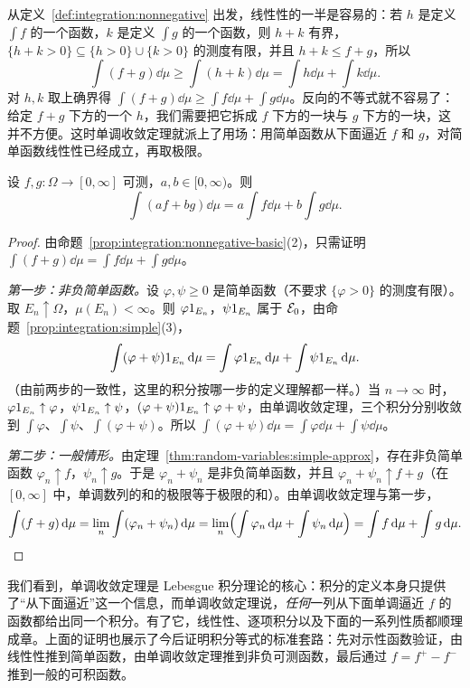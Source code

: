 
从定义~\ref{def:integration:nonnegative} 出发，线性性的一半是容易的：若 $h$ 是定义 $\int f$ 的一个函数，$k$ 是定义 $\int g$ 的一个函数，则 $h+k$ 有界，$\{h+k>0\}\subseteq\{h>0\}\cup\{k>0\}$ 的测度有限，并且 $h+k\leqslant f+g$，所以
\[
\int(f+g)\dd\mu\geqslant\int(h+k)\dd\mu=\int h\dd\mu+\int k\dd\mu .
\]
对 $h,k$ 取上确界得 $\int(f+g)\dd\mu\geqslant\int f\dd\mu+\int g\dd\mu$。反向的不等式就不容易了：给定 $f+g$ 下方的一个 $h$，我们需要把它拆成 $f$ 下方的一块与 $g$ 下方的一块，这并不方便。这时单调收敛定理就派上了用场：用简单函数从下面逼近 $f$ 和 $g$，对简单函数线性性已经成立，再取极限。

\begin{theorem}[非负函数积分的线性性]\label{thm:integration:linear-nonnegative}
设 $f,g:\Omega\to[0,\infty]$ 可测，$a,b\in[0,\infty)$。则
\[
\int(af+bg)\dd\mu=a\int f\dd\mu+b\int g\dd\mu .
\]
\end{theorem}
\begin{proof}
由命题~\ref{prop:integration:nonnegative-basic}(2)，只需证明 $\int(f+g)\dd\mu=\int f\dd\mu+\int g\dd\mu$。

\emph{第一步：非负简单函数。}设 $\varphi,\psi\geqslant0$ 是简单函数（不要求 $\{\varphi>0\}$ 的测度有限）。取 $E_n\uparrow\Omega$，$\mu(E_n)<\infty$。则 $\varphi1_{E_n}$，$\psi1_{E_n}$ 属于 $\mathcal{E}_0$，由命题~\ref{prop:integration:simple}(3)，
\[
\int(\varphi+\psi)1_{E_n}\,\mathrm{d}\mu=\int\varphi1_{E_n}\,\mathrm{d}\mu+\int\psi1_{E_n}\,\mathrm{d}\mu .
\]
（由前两步的一致性，这里的积分按哪一步的定义理解都一样。）当 $n\to\infty$ 时，$\varphi1_{E_n}\uparrow\varphi$，$\psi1_{E_n}\uparrow\psi$，$(\varphi+\psi)1_{E_n}\uparrow\varphi+\psi$，由单调收敛定理，三个积分分别收敛到 $\int\varphi$、$\int\psi$、$\int(\varphi+\psi)$。所以 $\int(\varphi+\psi)\dd\mu=\int\varphi\dd\mu+\int\psi\dd\mu$。

\emph{第二步：一般情形。}由定理~\ref{thm:random-variables:simple-approx}，存在非负简单函数 $\varphi_n\uparrow f$，$\psi_n\uparrow g$。于是 $\varphi_n+\psi_n$ 是非负简单函数，并且 $\varphi_n+\psi_n\uparrow f+g$（在 $[0,\infty]$ 中，单调数列的和的极限等于极限的和）。由单调收敛定理与第一步，
\[
\int(f+g)\,\mathrm{d}\mu=\lim_n\int(\varphi_n+\psi_n)\,\mathrm{d}\mu=\lim_n\Bigl(\int\varphi_n\,\mathrm{d}\mu+\int\psi_n\,\mathrm{d}\mu\Bigr)=\int f\,\mathrm{d}\mu+\int g\,\mathrm{d}\mu .
\]
\end{proof}

\begin{remark}
我们看到，单调收敛定理是 Lebesgue 积分理论的核心：积分的定义本身只提供了“从下面逼近”这一个信息，而单调收敛定理说，\emph{任何}一列从下面单调逼近 $f$ 的函数都给出同一个积分。有了它，线性性、逐项积分以及下面的一系列性质都顺理成章。上面的证明也展示了今后证明积分等式的标准套路：先对示性函数验证，由线性性推到简单函数，由单调收敛定理推到非负可测函数，最后通过 $f=f^+-f^-$ 推到一般的可积函数。
\end{remark}

